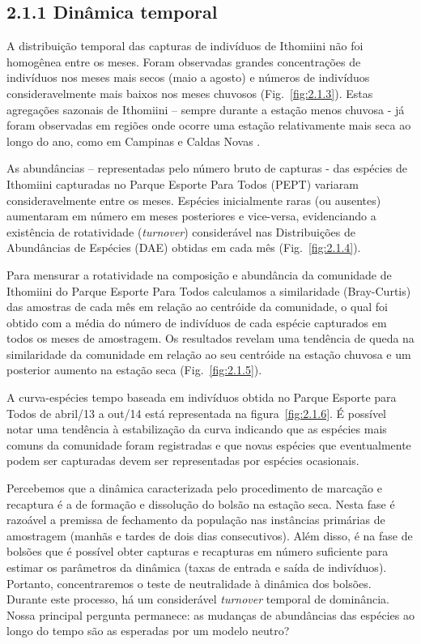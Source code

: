 \subsection{2.1.1 Dinâmica temporal} %
\label{sec:din-temp-borb}
A distribuição temporal das capturas de indivíduos de Ithomiini não
foi homogênea entre os meses. Foram observadas grandes concentrações
de indivíduos nos meses mais secos (maio a agosto) e números de
indivíduos consideravelmente mais baixos nos meses chuvosos
(Fig.~\ref{fig:2.1.3}). Estas agregações sazonais de Ithomiini –
sempre durante a estação menos chuvosa - já foram observadas em
regiões onde ocorre uma estação relativamente mais seca ao longo do
ano, como em Campinas \cite{brown2002} e Caldas Novas
\cite{Pinheiro_2008}.

As abundâncias – representadas pelo número bruto de capturas - das
espécies de Ithomiini capturadas no Parque Esporte Para Todos (PEPT)
variaram consideravelmente entre os meses. Espécies inicialmente raras
(ou ausentes) aumentaram em número em meses posteriores e vice-versa,
evidenciando a existência de rotatividade (\emph{turnover}) considerável nas
Distribuições de Abundâncias de Espécies (DAE) obtidas em cada mês
(Fig.~\ref{fig:2.1.4}).

Para mensurar a rotatividade na composição e
abundância da comunidade de Ithomiini do Parque Esporte Para Todos
calculamos a similaridade (Bray-Curtis) das amostras de cada mês em
relação ao centróide da comunidade, o qual foi obtido com a
média do número de indivíduos de cada espécie capturados em todos os
meses de amostragem. Os resultados revelam uma tendência de queda na
similaridade da comunidade em relação ao seu centróide na estação
chuvosa e um posterior aumento na estação seca (Fig.~\ref{fig:2.1.5}).

A curva-espécies tempo baseada em indivíduos obtida no Parque Esporte
para Todos de abril/13 a out/14 está representada na
figura~\ref{fig:2.1.6}. É possível notar uma tendência à estabilização
da curva indicando que as espécies mais comuns da comunidade foram
registradas e que novas espécies que eventualmente podem ser
capturadas devem ser representadas por espécies ocasionais.

Percebemos que a dinâmica caracterizada pelo procedimento de marcação e recaptura
é a de formação e dissolução do bolsão na estação seca. 
Nesta fase é razoável a premissa de fechamento da população nas instâncias primárias
de amostragem (manhãs e tardes de dois dias consecutivos). Além disso, é na fase de bolsões
que é possível obter capturas e recapturas em número suficiente para estimar os parâmetros
da dinâmica (taxas de entrada e saída de indivíduos). Portanto, concentraremos 
o teste de neutralidade à dinâmica dos bolsões. 
Durante este processo, há um considerável \emph{turnover} temporal de dominância.
Nossa principal pergunta permanece: as mudanças de abundâncias das espécies ao longo
do tempo são as esperadas por um modelo neutro?

